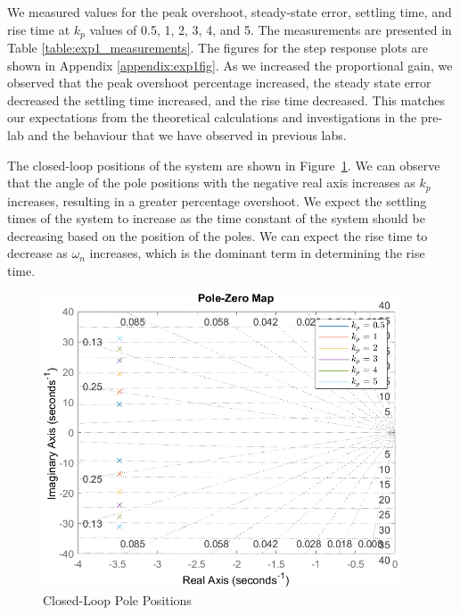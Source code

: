\documentclass[12pt]{article}
\begin{document}
We measured values for the peak overshoot, steady-state error, settling time, and rise time at $k_p$ values of 0.5, 1, 2, 3, 4, and 5. The measurements are presented in Table \ref{table:exp1_measurements}. The figures for the step response plots are shown in Appendix \ref{appendix:exp1fig}. As we increased the proportional gain, we observed that the peak overshoot percentage increased, the steady state error decreased the settling time increased, and the rise time decreased. This matches our expectations from the theoretical calculations and investigations in the pre-lab and the behaviour that we have observed in previous labs. %


The closed-loop positions of the system are shown in Figure~\ref{fig:exp1_pole}. We can observe that the angle of the pole positions with the negative real axis increases as $k_p$ increases, resulting in a greater percentage overshoot. We expect the settling times of the system to increase as the time constant of the system should be decreasing based on the position of the poles. We can expect the rise time to decrease as $\omega_n$ increases, which is the dominant term in determining the rise time.

\begin{figure}[h]
    \centering
    \includegraphics[width=0.94\textwidth]{exp1_pole}
    \caption{\label{fig:exp1_pole}Closed-Loop Pole Positions}
\end{figure}
\end{document}
